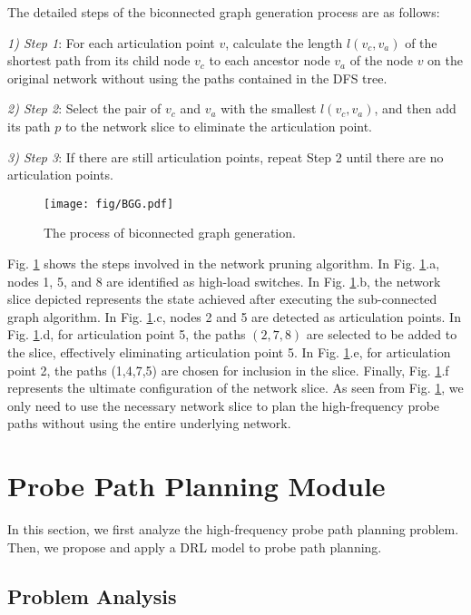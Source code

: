 \documentclass[journal]{IEEEtran}
\begin{document}
The detailed steps of the biconnected graph generation process are as follows:

\emph{1) Step 1}: For each articulation point $v$, calculate the length $l(v_c, v_a)$ of the shortest path from its child node $v_c$ to each ancestor node $v_a$ of the node $v$ on the original network without using the paths contained in the DFS tree.

\emph{2) Step 2}: Select the pair of $v_c$ and $v_a$ with the smallest $l(v_c, v_a)$, and then add its path $p$ to the network slice to eliminate the articulation point.

\emph{3) Step 3}: If there are still articulation points, repeat Step 2 until there are no articulation points.

\begin{figure}
\centering
\setlength{\abovecaptionskip}{0.cm}

\texttt{[image: fig/BGG.pdf]}
\caption{The process of biconnected graph generation. }
\label{fig8}
\vspace{-0.1cm}
\end{figure}

Fig. \ref{fig8} shows the steps involved in the network pruning algorithm. In Fig. \ref{fig8}.a, nodes 1, 5, and 8 are identified as high-load switches. In Fig. \ref{fig8}.b, the network slice depicted represents the state achieved after executing the sub-connected graph algorithm. In Fig. \ref{fig8}.c, nodes 2 and 5 are detected as articulation points. In Fig. \ref{fig8}.d, for articulation point 5, the paths $(2,7,8)$ are selected to be added to the slice, effectively eliminating articulation point 5. In Fig. \ref{fig8}.e, for articulation point 2, the paths (1,4,7,5) are chosen for inclusion in the slice. Finally, Fig. \ref{fig8}.f represents the ultimate configuration of the network slice.
As seen from Fig. \ref{fig8}, we only need to use the necessary network slice to plan the high-frequency probe paths without using the entire underlying network.


\section{Probe Path Planning Module}
\label{section6}

In this section, we first analyze the high-frequency probe path planning problem. Then, we propose and apply a DRL model to probe path planning.

\subsection{Problem Analysis}
\end{document}
